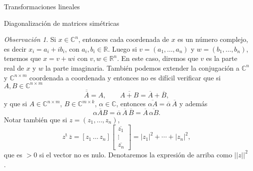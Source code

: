 \documentclass[a4paper,12pt,twoside,spanish,reqno]{amsbook}
\numberwithin{equation}{section}
\theoremstyle{definition}
\theoremstyle{remark}
\newtheorem{obs}[teorema]{Observaci\'on}
\renewcommand{\t}{{\operatorname{t}}}
\newcommand{\R}{\mathbb R}
\begin{document}
\begin{chapter}{Transformaciones lineales}
\begin{section}{Diagonalización de matrices simétricas}
\begin{obs}
        Si $x \in \mathbb{C}^n$,  entonces cada coordenada de $x$ es un número complejo,  es decir $x_i = a_i + ib_i$, con $a_i,b_i \in \R$. Luego si $v = (a_1,\ldots,a_n)$ y $w = (b_1,\ldots,b_n)$, tenemos que  $x = v + wi$  con  $v,w \in \R^n$.  En  este caso, diremos que $v$  es la parte real de $x$ y $w$ la parte imaginaria. También podemos extender la conjugación a $\mathbb{C}^n$ y  $\mathbb{C}^{n \times m}$ coordenada a coordenada y entonces no es difícil verificar que si $A, B \in \mathbb{C}^{n \times m}$
        \begin{equation*}\overline{\overline{A}} = A,\qquad \overline{A+B} = \overline{A}+\overline{B},
        \end{equation*}
        y que si $A\in \mathbb{C}^{n \times m}$, $ B \in \mathbb{C}^{m \times k}$, $\alpha \in \mathbb{C}$, entonces $\overline{\alpha A} =\overline{\alpha}\, \overline{A}$ y además
        \begin{equation*}\overline{\alpha A B} =\overline{\alpha}\, \overline{A}\,\overline{B} = \overline{A}\,\overline{\alpha B}.
        \end{equation*} 
        Notar también que si  $z = (z_1,\ldots,z_n)$, 
        \begin{equation*}z^\t \, \overline{z} = [ z_1 \, \ldots \, z_n ]
        {\begin{bmatrix} \overline{z_1} \\\vdots \\\overline{z_n} \end{bmatrix}} = |z_1|^2+\cdots+|z_n|^2,
        \end{equation*}   
        que es $>0$ si el vector no es nulo. Denotaremos la expresión de arriba como $||z||^2$.
        
    \end{obs}
    

\end{section}
\end{chapter}
\end{document}
